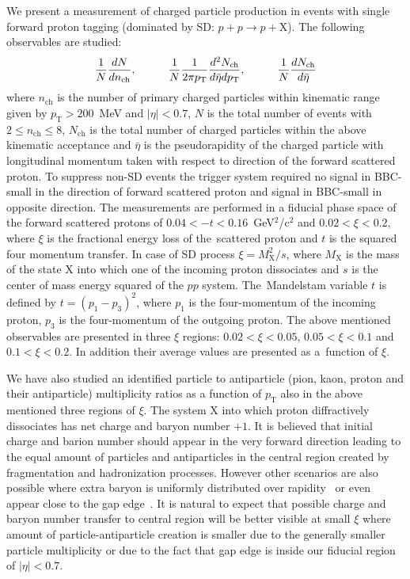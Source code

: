We present a measurement of charged particle production in events with single forward proton tagging (dominated by \ac{SD}: $p+p\to p+\textrm{X}$). The following observables are studied:
\begin{equation}
\frac{1}{N}\frac{dN}{dn_\textrm{ch}},\textrm{\hspace{1cm}} 
\frac{1}{N}\frac{1}{2\pi p_\textrm{T}}\frac{d^2N_\textrm{ch}}{d\bar{\eta}dp_\textrm{T}},\textrm{\hspace{1cm}} 
\frac{1}{N}\frac{dN_\textrm{ch}}{d\bar{\eta}}
\end{equation}
where $n_\textrm{ch}$ is the number of primary charged particles within kinematic range given by $p_\textrm{T}>200$~MeV and $|\eta|<0.7$, $N$ is the 
total number of events with $2\leq n_\textrm{ch}\leq8$, $N_\textrm{ch}$ is the total number of charged particles within the above kinematic acceptance and $\bar{\eta}$ is the pseudorapidity of the charged particle with longitudinal momentum taken with respect to direction of the forward scattered proton. To suppress non-SD events the trigger system required no signal in BBC-small in the direction of forward scattered proton and signal in BBC-small in opposite direction. The 
measurements are performed in a fiducial phase space of the forward scattered protons of $0.04<-t<0.16$~GeV$^2$/c$^2$ and 
$0.02<\xi<0.2$, where $\xi$ is the fractional energy loss of the~scattered proton and $t$ is the squared four momentum transfer. In case of SD process $\xi=M^2_\textrm{X}/s$, where $M_\textrm{X}$ is 
the mass of the state $\textrm{X}$ into which one of the incoming proton dissociates and $s$ is the center of mass energy squared of the $pp$ system. The~Mandelstam variable $t$ is defined by $t=(p_1-p_3)^2$,  where $p_1$ is the four-momentum of the incoming proton, $p_3$ is the four-momentum of the outgoing proton. The above mentioned observables are presented in three $\xi$ 
regions: $0.02<\xi<0.05$, $0.05<\xi<0.1$ and $0.1<\xi<0.2$. In addition their average values are presented as a~function of $\xi$.



We have also studied an identified particle to antiparticle (pion, kaon, proton and their antiparticle) multiplicity ratios as a function of $p_\textrm{T}$ also in the above mentioned three regions of $\xi$. The system $\textrm{X}$ into which proton diffractively dissociates has net charge and baryon number $+1$. It is believed that initial charge and barion number should appear in the very forward direction leading to the equal amount of particles and antiparticles in the central region created by fragmentation and hadronization processes. However other scenarios are also possible where extra baryon is uniformly distributed over rapidity~\cite{Kopeliovich:1988qm} or even appear close to the gap edge~\cite{Bopp:2000vg}. It is natural to expect that possible charge and baryon number transfer to central region will be better visible at small $\xi$ where amount of particle-antiparticle creation is smaller due to the generally smaller particle multiplicity or due to the fact that gap edge is inside our fiducial region of $|\eta|<0.7$.
